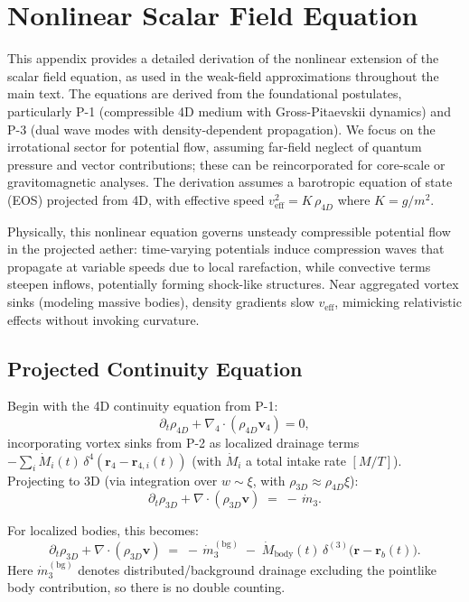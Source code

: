 \appendix
\section{Nonlinear Scalar Field Equation}

This appendix provides a detailed derivation of the nonlinear extension of the scalar field equation, as used in the weak-field approximations throughout the main text. The equations are derived from the foundational postulates, particularly P-1 (compressible 4D medium with Gross-Pitaevskii dynamics) and P-3 (dual wave modes with density-dependent propagation). We focus on the irrotational sector for potential flow, assuming far-field neglect of quantum pressure and vector contributions; these can be reincorporated for core-scale or gravitomagnetic analyses. The derivation assumes a barotropic equation of state (EOS) projected from 4D, with effective speed $v_{\text{eff}}^2 = K \, \rho_{4D}$ where $K = g/m^{2}$.

Physically, this nonlinear equation governs unsteady compressible potential flow in the projected aether: time-varying potentials induce compression waves that propagate at variable speeds due to local rarefaction, while convective terms steepen inflows, potentially forming shock-like structures. Near aggregated vortex sinks (modeling massive bodies), density gradients slow $v_{\text{eff}}$, mimicking relativistic effects without invoking curvature.

\subsection{Projected Continuity Equation}

Begin with the 4D continuity equation from P-1:
\[
\partial_t \rho_{4D} + \nabla_4 \cdot (\rho_{4D} \mathbf{v}_4) = 0,
\]
incorporating vortex sinks from P-2 as localized drainage terms
$-\sum_i \dot{M}_{i}(t)\,\delta^4(\mathbf{r}_4 - \mathbf{r}_{4,i}(t))$ (with $\dot M_i$ a total intake rate $[M/T]$). Projecting to 3D (via integration over $w \sim \xi$, with $\rho_{3D} \approx \rho_{4D} \xi$):
\begin{equation}
\partial_t \rho_{3D} + \nabla\!\cdot(\rho_{3D}\mathbf v) \;=\; -\,\dot m_{3}.
\end{equation}

For localized bodies, this becomes:
\begin{equation}
\partial_t \rho_{3D} + \nabla\!\cdot(\rho_{3D}\mathbf v)
\;=\; -\,\dot m_{3}^{(\mathrm{bg})}
\;-\; \dot M_{\text{body}}(t)\,\delta^{(3)}\!\big(\mathbf r-\mathbf r_b(t)\big).
\end{equation}
Here $\dot m_{3}^{(\mathrm{bg})}$ denotes distributed/background drainage excluding the pointlike body contribution, so there is no double counting.

